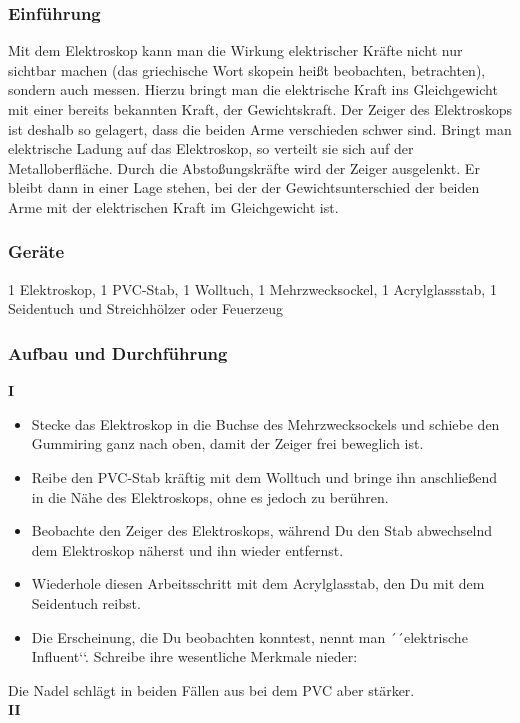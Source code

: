 \documentclass{report}
\begin{document}
\subsubsection{Einführung} Mit dem Elektroskop kann man die
Wirkung elektrischer Kräfte nicht nur sichtbar machen (das griechische Wort
skopein heißt beobachten, betrachten), sondern auch messen. Hierzu bringt man
die elektrische Kraft ins Gleichgewicht mit einer bereits bekannten Kraft, der
Gewichtskraft. Der Zeiger des Elektroskops ist deshalb so gelagert, dass die
beiden Arme verschieden schwer sind. Bringt man elektrische Ladung auf das
Elektroskop, so verteilt sie sich auf der Metalloberfläche. Durch die
Abstoßungskräfte wird der Zeiger ausgelenkt. Er bleibt dann in einer Lage
stehen, bei der der Gewichtsunterschied der beiden Arme mit der elektrischen
Kraft im Gleichgewicht ist. \subsubsection{Geräte} 1 Elektroskop, 1 PVC-Stab, 1
Wolltuch, 1 Mehrzwecksockel, 1 Acrylglassstab, 1 Seidentuch und Streichhölzer
oder Feuerzeug \subsubsection{Aufbau und Durchführung} \textbf{I}\\
\begin{itemize} \item Stecke das Elektroskop in die Buchse des Mehrzwecksockels
  und schiebe den Gummiring ganz nach oben, damit der Zeiger frei beweglich
  ist. \item Reibe den PVC-Stab kräftig mit dem Wolltuch und bringe ihn
  anschließend in die Nähe des Elektroskops, ohne es jedoch zu berühren. \item
  Beobachte den Zeiger des Elektroskops, während Du den Stab abwechselnd dem
  Elektroskop näherst und ihn wieder entfernst. \item Wiederhole diesen
  Arbeitsschritt mit dem Acrylglasstab, den Du mit dem Seidentuch reibst. \item
Die Erscheinung, die Du beobachten konntest, nennt man ´´elektrische
Influent‘‘. Schreibe ihre wesentliche Merkmale nieder: \end{itemize} Die Nadel
schlägt in beiden Fällen aus bei dem PVC aber stärker.\\ \textbf{II}\\
\end{document}
